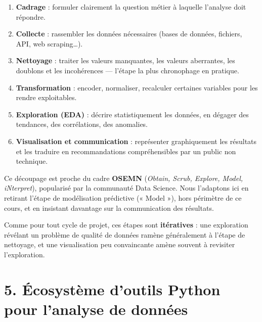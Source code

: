 \documentclass[
  french,
  letterpaper,
  open=any]{scrbook}
\providecommand{\tightlist}{%
  \setlength{\itemsep}{0pt}\setlength{\parskip}{0pt}}
\theoremstyle{definition}
\theoremstyle{definition}
\theoremstyle{remark}
\begin{document}
\begin{enumerate}
\def\labelenumi{\arabic{enumi}.}
\tightlist
\item
  \textbf{Cadrage} : formuler clairement la question métier à laquelle
  l'analyse doit répondre.
\item
  \textbf{Collecte} : rassembler les données nécessaires (bases de
  données, fichiers, API, web scraping\ldots).
\item
  \textbf{Nettoyage} : traiter les valeurs manquantes, les valeurs
  aberrantes, les doublons et les incohérences --- l'étape la plus
  chronophage en pratique.
\item
  \textbf{Transformation} : encoder, normaliser, recalculer certaines
  variables pour les rendre exploitables.
\item
  \textbf{Exploration (EDA)} : décrire statistiquement les données, en
  dégager des tendances, des corrélations, des anomalies.
\item
  \textbf{Visualisation et communication} : représenter graphiquement
  les résultats et les traduire en recommandations compréhensibles par
  un public non technique.
\end{enumerate}

\begin{tcolorbox}[enhanced jigsaw, arc=.35mm, bottomrule=.15mm, bottomtitle=1mm, breakable, colback=white, colbacktitle=quarto-callout-note-color!10!white, colframe=quarto-callout-note-color-frame, coltitle=black, left=2mm, leftrule=.75mm, opacityback=0, opacitybacktitle=0.6, rightrule=.15mm, title=\textcolor{quarto-callout-note-color}{\faInfo}\hspace{0.5em}{Repère}, titlerule=0mm, toprule=.15mm, toptitle=1mm]

Ce découpage est proche du cadre \textbf{OSEMN} (\emph{Obtain, Scrub,
Explore, Model, iNterpret}), popularisé par la communauté Data Science.
Nous l'adaptons ici en retirant l'étape de modélisation prédictive («
Model »), hors périmètre de ce cours, et en insistant davantage sur la
communication des résultats.

\end{tcolorbox}

Comme pour tout cycle de projet, ces étapes sont \textbf{itératives} :
une exploration révélant un problème de qualité de données ramène
généralement à l'étape de nettoyage, et une visualisation peu
convaincante amène souvent à revisiter l'exploration.

\section{5. Écosystème d'outils Python pour l'analyse de
données}\label{uxe9cosystuxe8me-doutils-python-pour-lanalyse-de-donnuxe9es}
\end{document}
